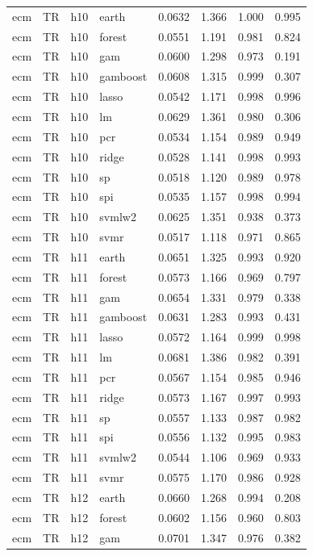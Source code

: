 \begin{ThreePartTable}
\begin{longtable}[t]{llclcccc}
\addlinespace
ecm & TR & h10 & earth & 0.0632 & 1.366 & 1.000 & 0.995\\
ecm & TR & h10 & forest & 0.0551 & 1.191 & 0.981 & 0.824\\
ecm & TR & h10 & gam & 0.0600 & 1.298 & 0.973 & 0.191\\
ecm & TR & h10 & gamboost & 0.0608 & 1.315 & 0.999 & 0.307\\
ecm & TR & h10 & lasso & 0.0542 & 1.171 & 0.998 & 0.996\\
ecm & TR & h10 & lm & 0.0629 & 1.361 & 0.980 & 0.306\\
ecm & TR & h10 & pcr & 0.0534 & 1.154 & 0.989 & 0.949\\
ecm & TR & h10 & ridge & 0.0528 & 1.141 & 0.998 & 0.993\\
ecm & TR & h10 & sp & 0.0518 & 1.120 & 0.989 & 0.978\\
ecm & TR & h10 & spi & 0.0535 & 1.157 & 0.998 & 0.994\\
ecm & TR & h10 & svmlw2 & 0.0625 & 1.351 & 0.938 & 0.373\\
ecm & TR & h10 & svmr & 0.0517 & 1.118 & 0.971 & 0.865\\
\addlinespace
ecm & TR & h11 & earth & 0.0651 & 1.325 & 0.993 & 0.920\\
ecm & TR & h11 & forest & 0.0573 & 1.166 & 0.969 & 0.797\\
ecm & TR & h11 & gam & 0.0654 & 1.331 & 0.979 & 0.338\\
ecm & TR & h11 & gamboost & 0.0631 & 1.283 & 0.993 & 0.431\\
ecm & TR & h11 & lasso & 0.0572 & 1.164 & 0.999 & 0.998\\
ecm & TR & h11 & lm & 0.0681 & 1.386 & 0.982 & 0.391\\
ecm & TR & h11 & pcr & 0.0567 & 1.154 & 0.985 & 0.946\\
ecm & TR & h11 & ridge & 0.0573 & 1.167 & 0.997 & 0.993\\
ecm & TR & h11 & sp & 0.0557 & 1.133 & 0.987 & 0.982\\
ecm & TR & h11 & spi & 0.0556 & 1.132 & 0.995 & 0.983\\
ecm & TR & h11 & svmlw2 & 0.0544 & 1.106 & 0.969 & 0.933\\
ecm & TR & h11 & svmr & 0.0575 & 1.170 & 0.986 & 0.928\\
\addlinespace
ecm & TR & h12 & earth & 0.0660 & 1.268 & 0.994 & 0.208\\
ecm & TR & h12 & forest & 0.0602 & 1.156 & 0.960 & 0.803\\
ecm & TR & h12 & gam & 0.0701 & 1.347 & 0.976 & 0.382\\

\end{longtable}
\end{ThreePartTable}
